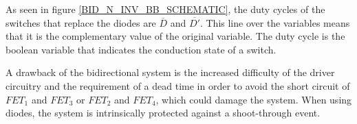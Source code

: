 As seen in figure \ref{BID_N_INV_BB_SCHEMATIC}, the duty cycles of the switches that replace the diodes are $\overline{D}$ and $\overline{D'}$. This line over the variables means that it is the complementary value of the original variable. The duty cycle is the boolean variable that indicates the conduction state of a switch. 
		
A drawback of the bidirectional system is the increased difficulty of the driver circuitry and the requirement of a dead time in order to avoid the short circuit of $FET_1$ and $FET_3$ or $FET_2$ and $FET_4$, which could damage the system. When using diodes, the system is intrinsically protected against a shoot-through event.
		
